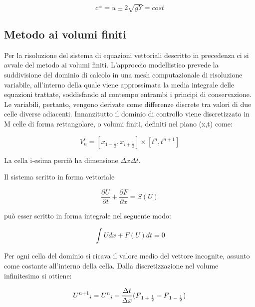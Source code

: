 \documentclass[12pt]{article} %
\begin{document}
\begin{equation}
    c^{\pm}=u\pm 2\sqrt{gY}=cost
\end{equation}

\subsection{Metodo ai volumi finiti}
\noindent Per la risoluzione del sistema di equazioni vettoriali descritto in precedenza ci si avvale del metodo ai volumi finiti.
L’approccio modellistico prevede la suddivisione del dominio di calcolo in una mesh computazionale di risoluzione variabile, all’interno della quale viene approssimata la media integrale delle equazioni trattate, soddisfando al contempo entrambi i principi di conservazione. Le variabili, pertanto, vengono derivate come differenze discrete tra valori di due celle diverse adiacenti.
Innanzitutto il dominio di controllo viene discretizzato in M celle  di forma rettangolare, o volumi finiti, definiti nel piano (x,t) come:

\begin{equation}
    V^{i}_n=[x_{1-\frac{1}{2}},x_{i+\frac{1}{2}}]\times[t^n,t^{n+1}]
\end{equation}

\noindent La cella i-esima perciò ha dimensione $\Delta x\Delta t$.

\noindent Il sistema scritto in forma vettoriale

\begin{equation}
    \frac{\partial U}{\partial t}+\frac{\partial F}{\partial x}=S(U)
\end{equation}

\noindent può esser scritto in forma integrale nel seguente modo:

\begin{equation}
    \int Udx+F(U)dt=0
\end{equation}

\noindent Per ogni cella del dominio si ricava il valore medio del vettore incognite, assunto come costante all’interno della cella. Dalla discretizzazione nel volume infinitesimo si ottiene:

\begin{equation}
    U^{n+1}\textsubscript{$i$}= U^{n}\textsubscript{$i$}-\frac{\Delta t}{\Delta x}(F\textsubscript{$1+\frac{1}{2}$}-F\textsubscript{$1-\frac{1}{2}$})
\end{equation}
\end{document}
